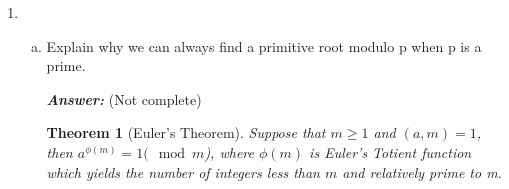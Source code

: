 \documentclass[11pt,a4paper]{article}
\newtheorem{theorem}{Theorem}
\begin{document}
\begin{enumerate}[1.]
\begin{flushleft}
\begin{lstlisting}[
				style={mystyle},
				caption={Primitve Roots Calculation},
				label={lst:primitive-roots}
				]
					primitive_roots
				}
				
				///
				/// Generates a list of integers less than n and co-prime to n.
				///
				pub fn coprime_nums_less_than_n(n: &BigInt) -> Vec<BigInt> {
					let mut coprimes: Vec<BigInt> = Vec::new();
					let r = range(BigInt::from(1u64), n.clone());
					
					for num in r {
						if n.gcd_euclid(&num) == BigInt::one() {
							coprimes.push(num)
						}
					}
					coprimes.sort();
					coprimes
				}
				
				///
				/// Get list of divisors of a number n > 2
				///
				pub fn divisors_of_n(n: &BigInt) -> Vec<BigInt> {
					let mut divisors: Vec<BigInt> = Vec::new();
					let mut primes = vec![BigInt::from(2u64)];
					let p_factors_n = n.prime_factors(&mut primes);
					let p_factors_n = p_factors_n
					.iter()
					.map(|(p, _)| p.clone())
					.collect::<Vec<BigInt>>();
					
					for p in p_factors_n {
						let mut i = 0;
						loop {
							let pow = p.pow(i);
							if n % &pow == BigInt::zero() {
								divisors.push(n / &pow);
								divisors.push(pow);
								i += 1;
							} else {
								break;
							}
						}
					}
					divisors.sort();
					divisors.dedup();
					divisors
				}
			\end{lstlisting}
			
		\end{flushleft}
		\item 
		\begin{enumerate}[a.]
			\item Explain why we can always find a primitive root modulo p when p is a prime.
			\bigskip
			\begin{flushleft}
				\textbf{\textit{Answer:}} (Not complete)
				\begin{theorem}[Euler's Theorem]
					\label{eulers_thm}
					Suppose that $m \ge 1$ and $(a, m) = 1$, then $a^{\phi(m)} = 1 (\mod m$), where $\phi(m)$ is Euler's Totient function which yields the number of integers less than $m$ and relatively prime to m.
				\end{theorem}
				

\end{flushleft}
\end{enumerate}
\end{enumerate}
\end{document}
